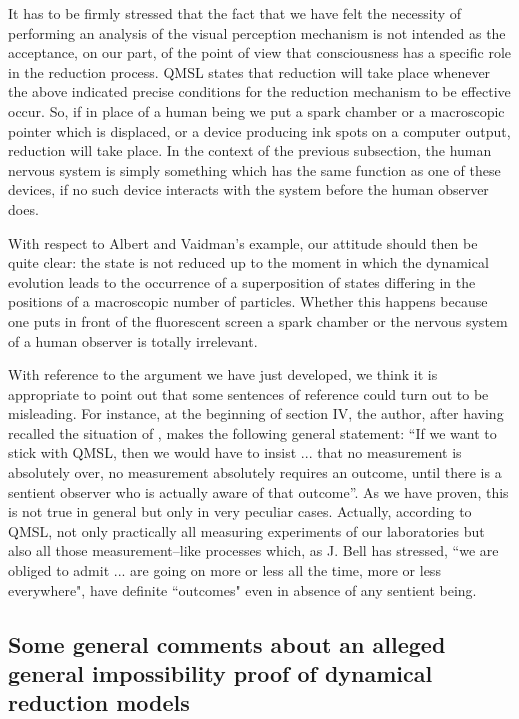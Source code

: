 \documentclass[12pt]{article}
\begin{document}
It has to be firmly stressed that the fact that we have felt the
necessity of performing an analysis of the visual perception
mechanism is not intended as the acceptance, on our part, of the
point of view that consciousness has a specific role in the
reduction process. QMSL states that reduction will take place
whenever the above indicated precise conditions for the reduction
mechanism to be effective occur. So, if in place of a human being
we put a spark chamber or a macroscopic pointer which is
displaced, or a device producing ink spots on a computer output,
reduction will take place. In the context of the previous
subsection, the human nervous system is simply something which has
the same function as one of these devices, if no such device
interacts with the system before the human observer does.

With respect to Albert and Vaidman's example, our attitude should
then be quite clear: the state is not reduced up to the moment in
which the dynamical evolution leads to the occurrence of a
superposition of states differing in the positions of a
macroscopic number of particles. Whether this happens because one
puts in front of the fluorescent screen a spark chamber or the
nervous system of a human observer is totally irrelevant.

With reference to the argument we have just developed, we think it
is appropriate to point out that some sentences of reference
\cite{ap} could turn out to be misleading. For instance, at the
beginning of section IV, the author, after having recalled the
situation of \cite{avp}, makes the following general statement:
``If we want to stick with QMSL, then we would have to insist ...
that no measurement is absolutely over, no measurement absolutely
requires an outcome, until there is a sentient observer who is
actually aware of that outcome''. As we have proven, this is not
true in general but only in very peculiar cases. Actually,
according to QMSL, not only practically all measuring experiments
of our laboratories but also all those measurement--like processes
which, as J. Bell \cite{bellam} has stressed, ``we are obliged to
admit ... are going on more or less all the time, more or less
everywhere", have definite ``outcomes" even in absence of any
sentient being.


\subsection[General comments on the impossibility proof of QMSL]{Some
general comments about an alleged general impossibility proof of
dynamical reduction models} \label{sec145}
\end{document}
